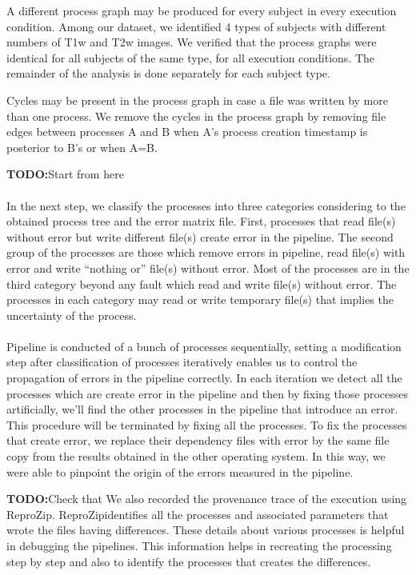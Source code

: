 \documentclass{article}
\newcommand{\todo}[1]{\color{red}\textbf{TODO:}#1\color{black}}
\newcommand{\reprozip}[0]{ReproZip}
\begin{document}
A different process graph may be produced for every subject in every
execution condition. Among our dataset, we identified 4 types of
subjects with different numbers of T1w and T2w images. We verified
that the process graphs were identical for all subjects of the same
type, for all execution conditions. The remainder of the analysis is
done separately for each subject type.

Cycles may be present in the process graph in case a file was written
by more than one process.  We remove the cycles in the process graph
by removing file edges between processes A and B when A's process
creation timestamp is posterior to B's or when A=B.

\todo{Start from here}
\paragraph{} In the next step, we classify the processes into three categories considering to the obtained process tree 
and the error matrix file. First, processes that read file(s) without error but write different file(s) create error in 
the pipeline. The second group of the processes are those which remove errors in pipeline, read file(s) with error and
 write “nothing or” file(s) without error. Most of the processes are in the third category beyond any fault which
 read and write file(s) without error. The processes in each category may read or write temporary file(s) that implies 
the uncertainty of the process.
\paragraph{} Pipeline is conducted of a bunch of processes sequentially, setting a modification step after classification
 of processes iteratively enables us to control the propagation of errors in the pipeline correctly. In each iteration
 we detect all the processes which are create error in the pipeline and then by fixing those processes artificially, 
we’ll find the other processes in the pipeline that introduce an error. This procedure will be terminated by fixing all the processes. 
To fix the processes that create error, we replace their dependency files with error by the same file copy from the results 
obtained in the other operating system. In this way, we were able to pinpoint the origin of the errors measured in the pipeline.

\todo{Check that} We also recorded the provenance trace of the execution using \reprozip. \reprozip identifies all the
processes and associated parameters that wrote the files having
differences.  These details about various processes is helpful in
debugging the pipelines. This information helps in recreating the
processing step by step and also to identify the processes that
creates the differences.
\end{document}
